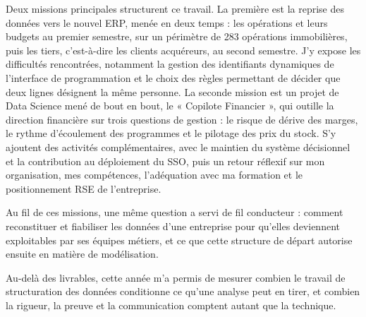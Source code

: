 Deux missions principales structurent ce travail. La première est la reprise des données vers
le nouvel ERP, menée en deux temps : les opérations et leurs budgets au premier semestre, sur
un périmètre de 283 opérations immobilières, puis les tiers, c'est-à-dire les clients
acquéreurs, au second semestre. J'y expose les difficultés rencontrées, notamment la gestion
des identifiants dynamiques de l'interface de programmation et le choix des règles permettant
de décider que deux lignes désignent la même personne. La seconde mission est un projet de Data
Science mené de bout en bout, le « Copilote Financier », qui outille la direction financière
sur trois questions de gestion : le risque de dérive des marges, le rythme d'écoulement des
programmes et le pilotage des prix du stock. S'y ajoutent des activités complémentaires, avec
le maintien du système décisionnel et la contribution au déploiement du SSO, puis un retour
réflexif sur mon organisation, mes compétences, l'adéquation avec ma formation et le
positionnement RSE de l'entreprise.

Au fil de ces missions, une même question a servi de fil conducteur : comment reconstituer et
fiabiliser les données d'une entreprise pour qu'elles deviennent exploitables par ses équipes
métiers, et ce que cette structure de départ autorise ensuite en matière de modélisation.

Au-delà des livrables, cette année m'a permis de mesurer combien le travail de structuration
des données conditionne ce qu'une analyse peut en tirer, et combien la rigueur, la preuve et la
communication comptent autant que la technique.
